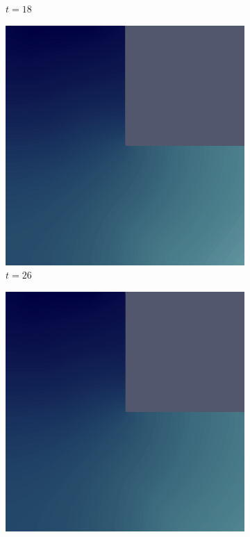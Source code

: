 \begin{figure}[H]
\begin{subfigure}{.4\textwidth}
        \caption{$t = 18$}
    \end{subfigure}
    \begin{subfigure}{.4\textwidth}
        \includegraphics[width=\textwidth]{imgs/LShapeSource_Solution/fifth.png}
        \caption{$t = 26$}
    \end{subfigure}
    \begin{subfigure}{.4\textwidth}
        \includegraphics[width=\textwidth]{imgs/LShapeSource_Solution/sixth.png}

\end{subfigure}
\end{figure}
